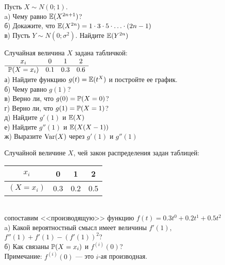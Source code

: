 \begin{problem}
Пусть $X\sim N(0;1)$. \\
a) Чему равно $\E(X^{2n+1})$? \\
б) Докажите, что $\E(X^{2n})=1\cdot 3\cdot 5\cdot\ldots\cdot(2n-1)$ \\
в) Пусть $Y\sim N(0;\sigma^{2})$. Найдите $\E(Y^{2n})$ 
\end{problem} 
\begin{solution} 

\end{solution}

\begin{problem}
Случайная величина $X$ задана табличкой: \\
$\begin{array}{cccc}
  x_{i} & 0 & 1 & 2 \\
  \hline
  \P(X=x_{i}) & 0.1 & 0.3 & 0.6 \\
\end{array}$ \\
а) Найдите функцию $g(t)=\E(t^{X})$ и постройте ее график. \\
б) Чему равно $g(1)$? \\
в) Верно ли, что $g(0)=\P(X=0)$? \\
г) Верно ли, что $g(1)=\P(X=1)$? \\
д) Найдите $g'(1)$ и $\E(X)$ \\
е) Найдите $g''(1)$ и $\E(X(X-1))$ \\
ж) Выразите $\Var(X)$ через $g'(1)$ и $g''(1)$ 
\end{problem} 
\begin{solution} 

\end{solution}

\begin{problem}
  Случайной величине $X$, чей закон распределения задан таблицей: \\
\begin{tabular}{|c|c|c|c|}
  \hline
  $x_{i}$ & 0 & 1 & 2 \\
  \hline
  $(X=x_{i})$ & 0.3 & 0.2 & 0.5 \\
  \hline
\end{tabular} \\
сопоставим <<производящую>> функцию
$f(t)=0.3t^{0}+0.2t^{1}+0.5t^{2}$ \\
a) Какой вероятностный смысл имеет величины $f'(1)$,
$f''(1)+f'(1)-(f'(1))^{2}$? \\
б) Как связаны $\P(X=x_{i})$ и $f^{(i)}(0)$? \\
Примечание: $f^{(i)}(0)$ --- это $i$-ая производная. 
\end{problem} 
\begin{solution} 

\end{solution}

